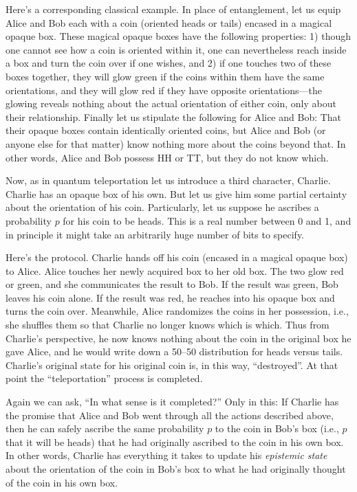 \documentclass[aps,pra,superscriptaddress,12pt,tightenlines,nofootinbib]{revtex4-2}
\begin{document}
Here's a corresponding classical example.  In place of entanglement,
let us equip Alice and Bob each with a coin (oriented heads or tails)
encased in a magical opaque box.  These magical opaque boxes have the
following properties:  1) though one cannot see how a coin is
oriented within it, one can nevertheless reach inside a box and turn
the coin over if one wishes, and 2) if one touches two of these boxes
together, they will glow green if the coins within them have the same
orientations, and they will glow red if they have opposite
orientations---the glowing reveals nothing about the actual
orientation of either coin, only about their relationship.  Finally
let us stipulate the following for Alice and Bob:  That their opaque
boxes contain identically oriented coins, but Alice and Bob (or
anyone else for that matter) know nothing more about the coins beyond
that.  In other words, Alice and Bob possess HH or TT, but they do
not know which.

Now, as in quantum teleportation let us introduce a third character,
Charlie.  Charlie has an opaque box of his own.  But let us give him
some partial certainty about the orientation of his coin.
Particularly, let us suppose he ascribes a probability $p$ for his
coin to be heads.  This is a real number between 0 and 1, and in
principle it might take an arbitrarily huge number of bits to specify.

Here's the protocol.  Charlie hands off his coin (encased in a magical
opaque box) to Alice.  Alice touches her newly acquired box to her old
box.  The two glow red or green, and she communicates the result to
Bob.  If the result was green, Bob leaves his coin alone.  If the
result was red, he reaches into his opaque box and turns the coin
over.  Meanwhile, Alice randomizes the coins in her possession, i.e.,
she shuffles them so that Charlie no longer knows which is which.
Thus from Charlie's perspective, he now knows nothing about the coin
in the original box he gave Alice, and he would write down a 50--50
distribution for heads versus tails.  Charlie's original state for his
original coin is, in this way, ``destroyed''.  At that point the
``teleportation'' process is completed.

Again we can ask, ``In what sense is it completed?''  Only in this:
If Charlie has the promise that Alice and Bob went through all the
actions described above, then he can safely ascribe the same
probability $p$ to the coin in Bob's box (i.e., $p$ that it will be
heads) that he had originally ascribed to the coin in his own box.  In
other words, Charlie has everything it takes to update his {\it
  epistemic state\/} about the orientation of the coin in Bob's box to
what he had originally thought of the coin in his own box.
\end{document}
